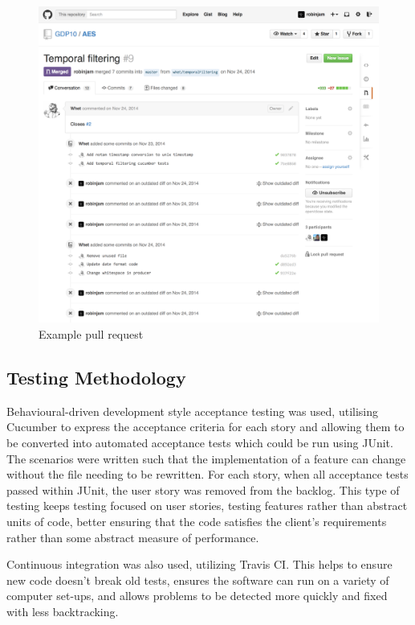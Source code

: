 \documentclass[a4paper, 12pt, twoside]{article}
\begin{document}
\begin{figure}
  \includegraphics[width=\linewidth]{pull_request.png}
  \caption{Example pull request}
  \label{fig:pull_request}
\end{figure}

\subsection{Testing Methodology}
\label{sec:plan_testing_methodology}

Behavioural-driven development style acceptance testing was used, utilising Cucumber to express the acceptance criteria for each story and allowing them to be converted into automated acceptance tests which could be run using JUnit. The scenarios were written such that the implementation of a feature can change without the file needing to be rewritten. For each story, when all acceptance tests passed within JUnit, the user story was removed from the backlog. This type of testing keeps testing focused on user stories, testing features rather than abstract units of code, better ensuring that the code satisfies the client's requirements rather than some abstract measure of performance.

Continuous integration was also used, utilizing Travis CI. This helps to ensure new code doesn't break old tests, ensures the software can run on a variety of computer set-ups, and allows problems to be detected more quickly and fixed with less backtracking.
\end{document}
